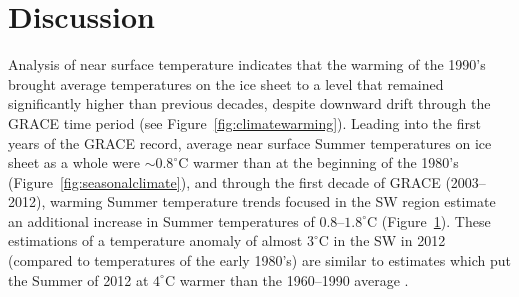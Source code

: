 \documentclass[11pt]{report}
\begin{document}
 \begin{figure}[h]
\centering
{}
\caption[Near Surface Temperature and Mass Anomaly Trends: 2003--2012]{} \label{fig:tslopes}
\end{figure}













\clearpage
\section{Discussion}


Analysis of near surface temperature indicates that the warming of the 1990's brought average temperatures on the ice sheet to a level that remained significantly higher than previous decades, despite downward drift through the GRACE time period (see Figure~\ref{fig:climatewarming}). Leading into the first years of the GRACE record, average near surface Summer temperatures on ice sheet as a whole were $\sim0.8^{\circ}$C warmer than at the beginning of the 1980's (Figure~\ref{fig:seasonalclimate}), and through the first decade of GRACE (2003--2012), warming Summer temperature trends focused in the SW region estimate an additional increase in Summer temperatures of $0.8$--$1.8^{\circ}$C (Figure~\ref{fig:tslopes}). These estimations of a temperature anomaly of almost $3^{\circ}$C in the SW in 2012 (compared to temperatures of the early 1980's) are similar to estimates which put the Summer of 2012 at $4^{\circ}$C warmer than the 1960--1990 average \cite[][]{angelen2014}.
\end{document}
